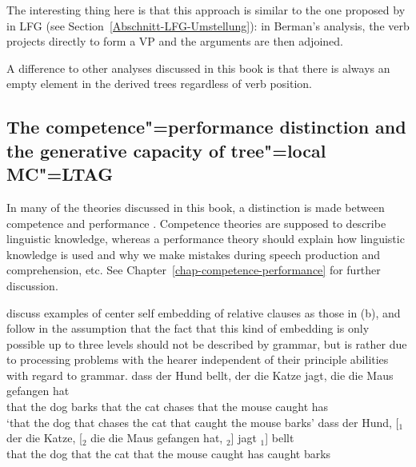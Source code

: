 The interesting thing here is that this approach is similar to the one proposed by \citet[Section~2.1.3]{Berman96a-u} in LFG\indexlfg
(see Section~\ref{Abschnitt-LFG-Umstellung}): in Berman's analysis, the verb projects directly to form a VP and the arguments are
then adjoined. 

A difference to other analyses discussed in this book is that there is always an empty
element in the derived trees regardless
of verb position.%

\subsection{The competence"=performance distinction and the generative capacity of tree"=local MC"=LTAG}
\label{Abschnitt-Kompetenz-Performanz-TAG}

In many of the theories discussed in this book, a distinction is made between competence and performance
\citep[Section~I.1]{Chomsky65a}. Competence theories are supposed to describe linguistic knowledge, whereas a performance theory should
explain how linguistic knowledge is used and why we make mistakes during speech production and
comprehension, etc. See Chapter~\ref{chap-competence-performance} for further discussion.

\citet*{JBR2000a} discuss examples of center self embedding of relative clauses as those in (b),
and follow \citet[]{CM63a}  in the assumption that the fact that this kind of embedding is only possible up to three levels should not be
described by grammar, but is rather due to processing problems with the hearer independent of their principle abilities with regard to grammar.
\eal
\label{TAG-Beispiel-Performanz}
\ex 
\gll dass der Hund bellt, der  die Katze jagt,  die  die Maus  gefangen hat\\
     that the dog  barks  that the cat   chases that the mouse caught   has\\
\glt `that the dog that chases the cat that caught the mouse barks'
\ex 
\gll dass der Hund, [$_1$ der die Katze, [$_2$ die die Maus gefangen hat, $_2$] jagt $_1$] bellt\\
     that the dog {} that the cat {} that the mouse caught has {} caught {} barks\\
\zl

